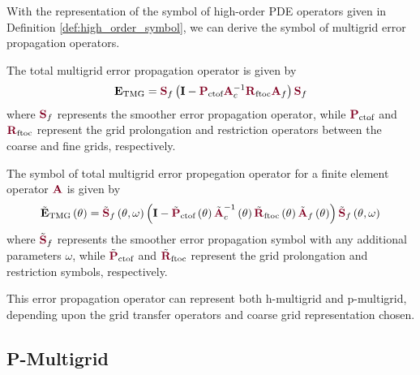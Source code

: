 With the representation of the symbol of high-order PDE operators given in Definition \ref{def:high_order_symbol}, we can derive the symbol of multigrid error propagation operators.

The total multigrid error propagation operator is given by
\begin{equation}
\mathbf{E}_{\text{TMG}} = {\color{burgundy}\mathbf{S}}_f \left( \mathbf{I} - {\color{burgundy}\mathbf{P}}_{\text{ctof}} {\color{burgundy}\mathbf{A}}_c^{-1} {\color{burgundy}\mathbf{R}}_{\text{ftoc}} {\color{burgundy}\mathbf{A}}_f \right) {\color{burgundy}\mathbf{S}}_f
\end{equation}
where ${\color{burgundy}\mathbf{S}}_f$ represents the smoother error propagation operator, while ${\color{burgundy}\mathbf{P}}_{\text{ctof}}$ and ${\color{burgundy}\mathbf{R}}_{\text{ftoc}}$ represent the grid prolongation and restriction operators between the coarse and fine grids, respectively.

\begin{definition}
The symbol of total multigrid error propegation operator for a finite element operator ${\color{burgundy}\mathbf{A}}$ is given by
\begin{equation}
\tilde{\mathbf{E}}_{\text{TMG}} \left( \mathbf{\theta} \right) = \tilde{{\color{burgundy}\mathbf{S}}}_f \left( \mathbf{\theta}, \omega \right) \left( \mathbf{I} - \tilde{{\color{burgundy}\mathbf{P}}}_{\text{ctof}} \left( \mathbf{\theta} \right) \tilde{{\color{burgundy}\mathbf{A}}}_c^{-1} \left( \mathbf{\theta} \right) \tilde{{\color{burgundy}\mathbf{R}}}_{\text{ftoc}} \left( \mathbf{\theta} \right) \tilde{{\color{burgundy}\mathbf{A}}}_f \left( \mathbf{\theta} \right) \right) \tilde{{\color{burgundy}\mathbf{S}}}_f \left( \mathbf{\theta}, \omega \right)
\end{equation}
where $\tilde{{\color{burgundy}\mathbf{S}}}_f$ represents the smoother error propagation symbol with any additional parameters $\omega$, while $\tilde{{\color{burgundy}\mathbf{P}}}_{\text{ctof}}$ and $\tilde{{\color{burgundy}\mathbf{R}}}_{\text{ftoc}}$ represent the grid prolongation and restriction symbols, respectively.
\label{def:multigrid_symbol}
\end{definition}

This error propagation operator can represent both h-multigrid and p-multigrid, depending upon the grid transfer operators and coarse grid representation chosen.

\subsection{P-Multigrid}


